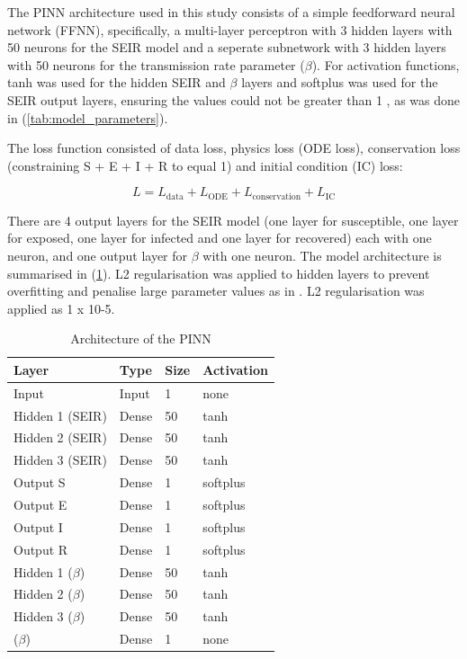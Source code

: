 \documentclass{article}
\begin{document}
The PINN architecture used in this study consists of a simple feedforward neural network (FFNN), specifically, a multi-layer perceptron \parencite{Rumelhart1986} with 3 hidden layers with 50 neurons for the SEIR model and a seperate subnetwork with 3 hidden layers with 50 neurons for the transmission rate parameter ($\beta$). For activation functions, tanh was used for the hidden SEIR and $\beta$ layers and softplus was used for the SEIR output layers, ensuring the values could not be greater than 1 \parencite{Dubey2022}, as was done in \parencite{https://doi.org/10.48550/arxiv.2506.03897}(\cref{tab:model_parameters}). 

The loss function consisted of data loss, physics loss (ODE loss), conservation loss (constraining S + E + I + R to equal 1) and initial condition (IC) loss:

\begin{equation}
L = L_\text{data} + L_\text{ODE} + L_\text{conservation} + L_\text{IC}
\end{equation}

There are 4 output layers for the SEIR model (one layer for susceptible, one layer for exposed, one layer for infected and one layer for recovered) each with one neuron, and one output layer for $\beta$ with one neuron. The model architecture is summarised in (\cref{tab:PINN_architecture}). L2 regularisation was applied to hidden layers to prevent overfitting and penalise large parameter values as in \parencite{Qian2025} \parencite{https://doi.org/10.48550/arxiv.1205.2653}. L2 regularisation was applied as 1 x 10-5.

\begin{table}[h]
    \centering
    \caption{Architecture of the PINN}
    \label{tab:PINN_architecture}
    \begin{tabular}{llll}
        \toprule
        Layer & Type & Size & Activation \\
        \midrule
        Input & Input & 1 & none \\
        Hidden 1 (SEIR) & Dense & 50 & tanh \\
        Hidden 2 (SEIR) & Dense & 50 & tanh \\
        Hidden 3 (SEIR) & Dense & 50 & tanh \\
        Output S & Dense & 1 & softplus \\
        Output E & Dense & 1 & softplus \\
        Output I & Dense & 1 & softplus \\
        Output R & Dense & 1 & softplus \\
        Hidden 1 ($\beta$) & Dense & 50 & tanh \\
        Hidden 2 ($\beta$) & Dense & 50 & tanh \\
        Hidden 3 ($\beta$) & Dense & 50 & tanh \\
        ($\beta$) & Dense & 1 & none \\
        \bottomrule
    \end{tabular}
\end{table}
\end{document}
